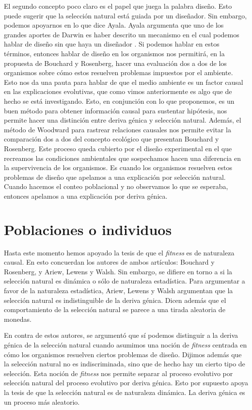 El segundo concepto poco claro es el papel que juega la palabra diseño. Esto puede sugerir que la selección natural está guiada por un diseñador. Sin embargo, podemos apoyarnos en lo que dice Ayala. Ayala argumenta que uno de los grandes aportes de Darwin es haber descrito un mecanismo en el cual podemos hablar de diseño sin que haya un diseñador \cite{Ayala2004}. Si podemos hablar en estos términos, entonces hablar de diseño en los organismos nos permitirá, en la propuesta de Bouchard y Rosenberg, hacer una evaluación dos a dos de los organismos sobre cómo estos resuelven problemas impuestos por el ambiente. Esto nos da una pauta para hablar de que el medio ambiente es un factor causal en las explicaciones evolutivas, que como vimos anteriormente es algo que de hecho se está investigando. Esto, en conjunción con lo que proponemos, es un buen método para obtener información causal para sustentar hipótesis, nos permite hacer una distinción entre deriva génica y selección natural. Además, el método de Woodward para rastrear relaciones causales nos permite evitar la comparación dos a dos del concepto  ecológico que presentan Bouchard y Rosenberg. Este proceso queda cubierto por el diseño experimental en el que recreamos las condiciones ambientales que sospechamos hacen una diferencia en la supervivencia de los organismos. Es cuando los organismos resuelven estos problemas de diseño que apelamos a una explicación por selección natural. Cuando hacemos el conteo poblacional y no observamos lo que se esperaba, entonces apelamos a una explicación por deriva génica.

\section{Poblaciones o individuos}

\noindent Hasta este momento hemos apoyado la tesis de que el \emph{fitness} es de naturaleza causal. En esto concuerdan los autores de ambos artículos: Bouchard y Rosenberg, y Ariew, Lewens y Walsh. Sin embargo, se difiere en torno a si la selección natural es dinámica o sólo de naturaleza estadística. Para argumentar a favor de la naturaleza estadística, Ariew, Lewens y Walsh argumentan que la selección natural es indistinguible de la deriva génica. Dicen además que el comportamiento de la selección natural se parece a una tirada aleatoria de monedas.

En contra de estos autores, se argumentó que sí podemos distinguir a la deriva génica de la selección natural cuando asumimos una noción de \emph{fitness} centrada en cómo los organismos resuelven ciertos problemas de diseño. Dijimos además que la selección natural no es indiscriminada, sino que de hecho hay un cierto tipo de selección. Esta noción de \emph{fitness} nos permite separar al proceso evolutivo por selección natural del proceso evolutivo por deriva génica. Esto por supuesto apoya la tesis de que la selección natural es de naturaleza dinámica. La deriva génica es un proceso más aleatorio.

